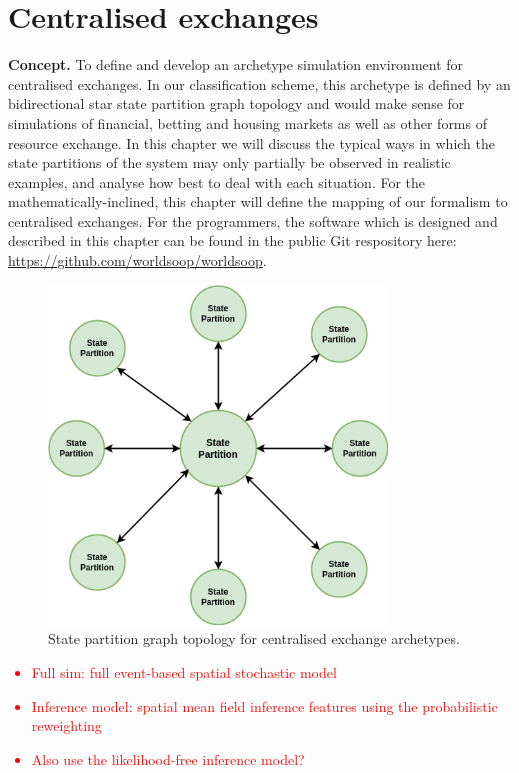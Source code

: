 \chapter{\sffamily Centralised exchanges}

{\bfseries\sffamily Concept.} To define and develop an archetype simulation environment for centralised exchanges. In our classification scheme, this archetype is defined by an bidirectional star state partition graph topology and would make sense for simulations of financial, betting and housing markets as well as other forms of resource exchange. In this chapter we will discuss the typical ways in which the state partitions of the system may only partially be observed in realistic examples, and analyse how best to deal with each situation. For the mathematically-inclined, this chapter will define the mapping of our formalism to centralised exchanges. For the programmers, the software which is designed and described in this chapter can be found in the public Git respository here: \href{https://github.com/worldsoop/worldsoop}{https://github.com/worldsoop/worldsoop}.

\begin{figure}[h]
\centering
\includegraphics[width=9cm]{images/chapter-10-state-partition-graph.drawio.png}
\caption{State partition graph topology for centralised exchange archetypes.}
\label{fig:state-partition-graph-centralised-exchanges}
\end{figure}

\textcolor{red}{
\begin{itemize}
\item{Full sim: full event-based spatial stochastic model}
\item{Inference model: spatial mean field inference features using the probabilistic reweighting }
\item{Also use the likelihood-free inference model?}
\end{itemize}
}

